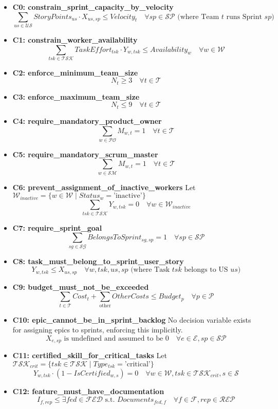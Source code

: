 \documentclass[11pt, a4paper]{article}
\begin{document}
\begin{itemize}
    \item \textbf{C0: constrain\_sprint\_capacity\_by\_velocity}
    $$ \sum_{us \in \mathcal{US}} StoryPoints_{us} \cdot X_{us,sp} \leq Velocity_{t} \quad \forall sp \in \mathcal{SP} \text{ (where Team } t \text{ runs Sprint } sp\text{)} $$
    \item \textbf{C1: constrain\_worker\_availability}
    $$ \sum_{tsk \in \mathcal{TSK}} TaskEffort_{tsk} \cdot Y_{w,tsk} \leq Availability_{w} \quad \forall w \in \mathcal{W} $$
    \item \textbf{C2: enforce\_minimum\_team\_size}
    $$ N_{t} \geq 3 \quad \forall t \in \mathcal{T} $$
    \item \textbf{C3: enforce\_maximum\_team\_size}
    $$ N_{t} \leq 9 \quad \forall t \in \mathcal{T} $$
    \item \textbf{C4: require\_mandatory\_product\_owner}
    $$ \sum_{w \in \mathcal{PO}} M_{w,t} = 1 \quad \forall t \in \mathcal{T} $$
    \item \textbf{C5: require\_mandatory\_scrum\_master}
    $$ \sum_{w \in \mathcal{SM}} M_{w,t} = 1 \quad \forall t \in \mathcal{T} $$
    \item \textbf{C6: prevent\_assignment\_of\_inactive\_workers}
    Let $\mathcal{W}_{inactive} = \{w \in \mathcal{W} \mid Status_w = \text{'inactive'}\}$
    $$ \sum_{tsk \in \mathcal{TSK}} Y_{w,tsk} = 0 \quad \forall w \in \mathcal{W}_{inactive} $$
    \item \textbf{C7: require\_sprint\_goal}
    $$ \sum_{sg \in \mathcal{SG}} BelongsToSprint_{sg,sp} = 1 \quad \forall sp \in \mathcal{SP} $$
    \item \textbf{C8: task\_must\_belong\_to\_sprint\_user\_story}
    $$ Y_{w,tsk} \leq X_{us,sp} \quad \forall w, tsk, us, sp \text{ (where Task } tsk \text{ belongs to US } us\text{)} $$
    \item \textbf{C9: budget\_must\_not\_be\_exceeded}
    $$ \sum_{t \in \mathcal{T}} Cost_{t} + \sum_{\text{other}} OtherCosts \leq Budget_{p} \quad \forall p \in \mathcal{P} $$
    \item \textbf{C10: epic\_cannot\_be\_in\_sprint\_backlog}
    No decision variable exists for assigning epics to sprints, enforcing this implicitly.
    $$ X_{e,sp} \text{ is undefined and assumed to be } 0 \quad \forall e \in \mathcal{E}, sp \in \mathcal{SP} $$
    \item \textbf{C11: certified\_skill\_for\_critical\_tasks}
    Let $\mathcal{TSK}_{crit} = \{tsk \in \mathcal{TSK} \mid Type_{tsk} = \text{'critical'}\}$
    $$ Y_{w,tsk} \cdot (1 - IsCertified_{w,s}) = 0 \quad \forall w \in \mathcal{W}, tsk \in \mathcal{TSK}_{crit}, s \in \mathcal{S} $$
    \item \textbf{C12: feature\_must\_have\_documentation}
    $$ I_{f,rep} \leq \exists fed \in \mathcal{FED} \text{ s.t. } Documents_{fed,f} \quad \forall f \in \mathcal{F}, rep \in \mathcal{REP} $$
\end{itemize}
\end{document}
